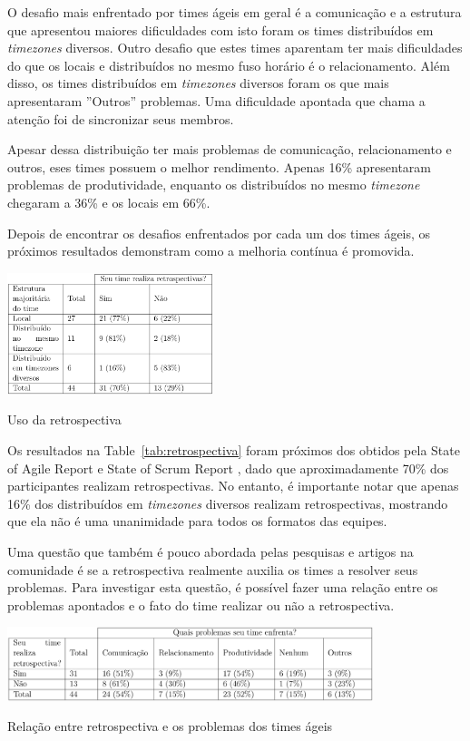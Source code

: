 \documentclass[12pt]{article}
\begin{document}
O desafio mais enfrentado por times ágeis em geral é a comunicação e a estrutura que apresentou maiores dificuldades com isto foram os times distribuídos em \textit{timezones} diversos. Outro desafio que estes times aparentam ter mais dificuldades do que os locais e distribuídos no mesmo fuso horário é o relacionamento. Além disso, os times distribuídos em \textit{timezones} diversos foram os que mais apresentaram ''Outros'' problemas. Uma dificuldade apontada que chama a atenção foi de sincronizar seus membros.

Apesar dessa distribuição ter mais problemas de comunicação, relacionamento e outros, eses times possuem o melhor rendimento. Apenas 16\% apresentaram problemas de produtividade, enquanto os distribuídos no mesmo \textit{timezone} chegaram a 36\% e os locais em 66\%.

Depois de encontrar os desafios enfrentados por cada um dos times ágeis, os próximos resultados demonstram como a melhoria contínua é promovida.

\begin{table}[ht]
\centering
\includegraphics[width=0.45\textwidth]{retrospectiva.png}
\caption{Uso da retrospectiva}
\label{tab:retrospectiva}
\end{table}

Os resultados na Table~\ref{tab:retrospectiva} foram próximos dos obtidos pela State of Agile Report \cite{version:15} e State of Scrum Report \cite{scrum:15}, dado que aproximadamente 70\% dos participantes realizam retrospectivas. No entanto, é importante notar que apenas 16\% dos distribuídos em \textit{timezones} diversos realizam retrospectivas, mostrando que ela não é uma unanimidade para todos os formatos das equipes.

Uma questão que também é pouco abordada pelas pesquisas e artigos na comunidade é se a retrospectiva realmente auxilia os times a resolver seus problemas. Para investigar esta questão, é possível fazer uma relação entre os problemas apontados e o fato do time realizar ou não a retrospectiva.

\begin{table}[ht]
\centering
\includegraphics[width=0.8\textwidth]{retrospectivaValeAPena.png}
\caption{Relação entre retrospectiva e os problemas dos times ágeis}
\label{tab:retrospectivaValeAPena}
\end{table}
\end{document}

